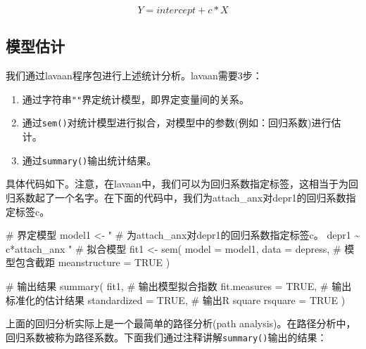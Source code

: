\documentclass[
  chinese-hans,
  letterpaper,
  DIV=11,
  numbers=noendperiod]{scrartcl}
\newenvironment{Shaded}{\begin{snugshade}}{\end{snugshade}}
\newcommand{\AttributeTok}[1]{\textcolor[rgb]{0.40,0.45,0.13}{#1}}
\newcommand{\CommentTok}[1]{\textcolor[rgb]{0.37,0.37,0.37}{#1}}
\newcommand{\ConstantTok}[1]{\textcolor[rgb]{0.56,0.35,0.01}{#1}}
\newcommand{\FunctionTok}[1]{\textcolor[rgb]{0.28,0.35,0.67}{#1}}
\newcommand{\NormalTok}[1]{\textcolor[rgb]{0.00,0.23,0.31}{#1}}
\newcommand{\OtherTok}[1]{\textcolor[rgb]{0.00,0.23,0.31}{#1}}
\newcommand{\StringTok}[1]{\textcolor[rgb]{0.13,0.47,0.30}{#1}}
\providecommand{\tightlist}{%
  \setlength{\itemsep}{0pt}\setlength{\parskip}{0pt}}
\begin{document}
\[
Y = intercept + c*X
\]

\subsection{模型估计}\label{ux6a21ux578bux4f30ux8ba1}

我们通过lavaan程序包进行上述统计分析。lavaan需要3步：

\begin{enumerate}
\def\labelenumi{\arabic{enumi}.}
\tightlist
\item
  通过字符串\texttt{""}界定统计模型，即界定变量间的关系。
\item
  通过\texttt{sem()}对统计模型进行拟合，对模型中的参数(例如：回归系数)进行估计。
\item
  通过\texttt{summary()}输出统计结果。
\end{enumerate}

具体代码如下。注意，在lavaan中，我们可以为回归系数指定标签，这相当于为回归系数起了一个名字。在下面的代码中，我们为attach\_anx对depr1的回归系数指定标签c。

\begin{Shaded}
\begin{Highlighting}[numbers=left,,]
\CommentTok{\# 界定模型}
\NormalTok{model1 }\OtherTok{\textless{}{-}} \StringTok{"}
\StringTok{  \# 为attach\_anx对depr1的回归系数指定标签c。}
\StringTok{  depr1 \textasciitilde{} c*attach\_anx}
\StringTok{"}
\CommentTok{\# 拟合模型}
\NormalTok{fit1 }\OtherTok{\textless{}{-}} \FunctionTok{sem}\NormalTok{(}
  \AttributeTok{model =}\NormalTok{ model1,}
  \AttributeTok{data =}\NormalTok{ depress,}
  \CommentTok{\# 模型包含截距}
  \AttributeTok{meanstructure =} \ConstantTok{TRUE}
\NormalTok{)}
\end{Highlighting}
\end{Shaded}

\begin{Shaded}
\begin{Highlighting}[numbers=left,,]
\CommentTok{\# 输出结果}
\FunctionTok{summary}\NormalTok{(}
\NormalTok{  fit1,}
  \CommentTok{\# 输出模型拟合指数}
  \AttributeTok{fit.measures =} \ConstantTok{TRUE}\NormalTok{,}
  \CommentTok{\# 输出标准化的估计结果}
  \AttributeTok{standardized =} \ConstantTok{TRUE}\NormalTok{,}
  \CommentTok{\# 输出R square}
  \AttributeTok{rsquare =} \ConstantTok{TRUE}
\NormalTok{)}
\end{Highlighting}
\end{Shaded}

上面的回归分析实际上是一个最简单的路径分析(path
analysis)。在路径分析中，回归系数被称为路径系数。下面我们通过注释讲解\texttt{summary()}输出的结果：
\end{document}
